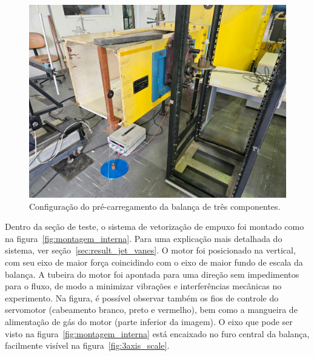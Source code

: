 \begin{figure}[htbp]
    \centering
    \includegraphics[width=\textwidth]{img/montagem_externa.jpeg}
    \caption{Configuração do pré-carregamento da balança de três componentes.}\label{fig:pre_loading}
\end{figure}

Dentro da seção de teste, o sistema de vetorização de empuxo foi montado como na figura~\ref{fig:montagem_interna}. Para uma explicação mais detalhada do sistema, ver seção~\ref{sec:result_jet_vanes}. O motor foi posicionado na vertical, com seu eixo de maior força coincidindo com o eixo de maior fundo de escala da balança. A tubeira do motor foi apontada para uma direção sem impedimentos para o fluxo, de modo a minimizar vibrações e interferências mecânicas no experimento. Na figura, é possível observar também os fios de controle do servomotor (cabeamento branco, preto e vermelho), bem como a mangueira de alimentação de gás do motor (parte inferior da imagem). O eixo que pode ser visto na figura~\ref{fig:montagem_interna} está encaixado no furo central da balança, facilmente visível na figura~\ref{fig:3axis_scale}.


